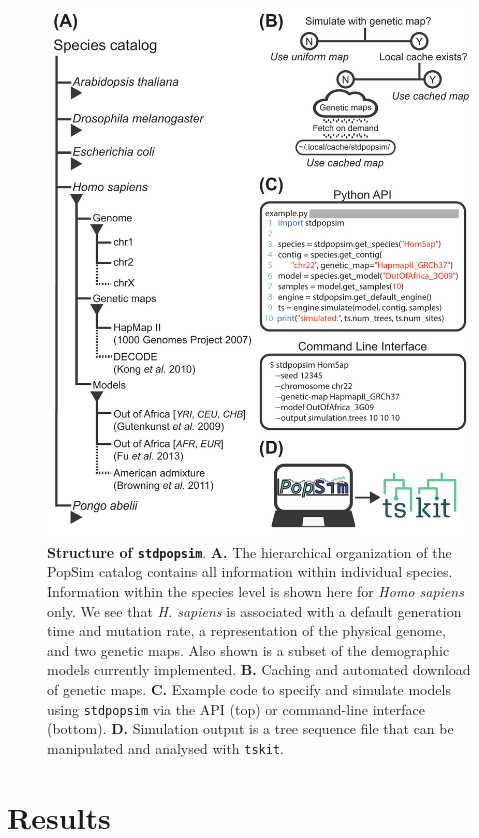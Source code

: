 \documentclass[12pt,halfline,a4paper]{ouparticle}
\newcommand{\stdpopsim}{\texttt{stdpopsim}\xspace}
\newcommand{\tskit}{\texttt{tskit}\xspace}
\begin{document}
\begin{figure}[t]
\begin{center}
\includegraphics[width=0.5\linewidth]{display_items/Figure1.pdf}
\caption{\textbf{Structure of \stdpopsim}. \textbf{A.} The
hierarchical organization of the PopSim catalog contains all information
within individual species. Information within the species level is shown here
for \emph{Homo sapiens} only. We see that \emph{H. sapiens} is associated
with a default generation time and mutation rate,
a representation of the physical genome, and two genetic maps. Also shown is a
subset of the demographic models currently implemented. \textbf{B.} Caching
and automated download of genetic maps. \textbf{C.} Example code to specify
and simulate models using \stdpopsim via the API (top) or
command-line interface (bottom). \textbf{D.} Simulation output
is a tree sequence file that can
be manipulated and analysed with \tskit.}
\label{fig:cartoon}
\end{center}
\end{figure}

\section*{Results}
\end{document}
